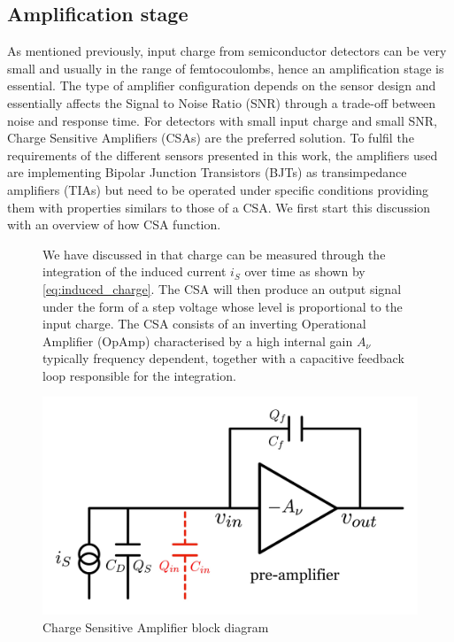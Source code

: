 		\subsection{Amplification stage }\label{subsec:2.3.2}
		As mentioned previously, input charge from semiconductor detectors can be very small and usually in the range of femtocoulombs, hence an amplification stage is essential. The type of amplifier configuration depends on the sensor design and essentially affects the Signal to Noise Ratio (SNR) through a trade-off between noise and response time. For detectors with small input charge and small SNR, Charge Sensitive Amplifiers (CSAs) are the preferred solution. To fulfil the requirements of the different sensors presented in this work, the amplifiers used are implementing Bipolar Junction Transistors (BJTs) as transimpedance amplifiers (TIAs) but need to be operated under specific conditions providing them with properties similars to those of a CSA. We first start this discussion with an overview of how CSA function.   
		\begin{figure}[h]
		\begin{minipage}{0.49\linewidth}
			We have discussed in  that charge can be measured through the integration of the induced current $i_{S}$ over time as shown by \eqref{eq:induced_charge}. The CSA will then produce an output signal under the form of a step voltage whose level is proportional to the input charge. The CSA consists of an inverting Operational Amplifier (OpAmp) characterised by a high internal gain $A_\nu$ typically frequency dependent, together with a capacitive feedback loop responsible for the integration. 
		\end{minipage}\hfill
		\begin{minipage}{0.49\linewidth}
		\centering
		\includegraphics[width=0.9\linewidth]{files/CSA_block_diagram}
		\caption{Charge Sensitive Amplifier block diagram}
		\label{ }
		\end{minipage}
		\end{figure} 

